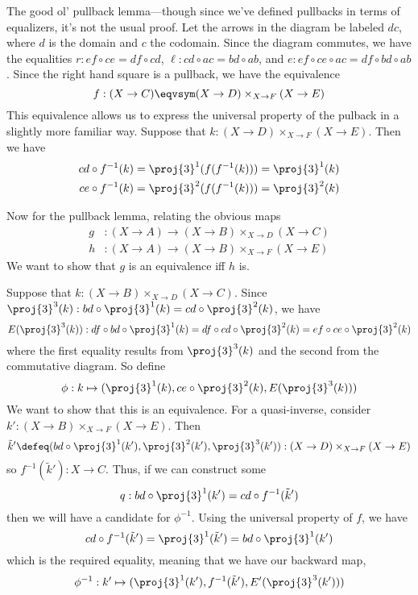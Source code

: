  \soln
The good ol' pullback lemma---though since we've defined pullbacks in terms of
equalizers, it's not the usual proof.  Let the arrows in the diagram be labeled
$dc$, where $d$ is the domain and $c$ the codomain.  Since the diagram
commutes, we have the equalities $r : ef \circ ce = df \circ cd$, 
$\ell : cd \circ ac = bd \circ ab$, and $e : ef \circ ce \circ ac = df \circ bd
\circ ab$.  Since the right hand square is a pullback, we have the equivalence
\[
  f : (X \to C) \eqvsym (X \to D) \times_{X \to F} (X \to E)
\]
This equivalence allows us to express the universal property of the pulback in
a slightly more familiar way.  Suppose that $k : (X \to D) \times_{X \to F}
(X \to E)$.  Then we have
\begin{align*}
  cd \circ f^{-1}(k) &= \proj{3}^{1}(f(f^{-1}(k))) = \proj{3}^{1}(k) \\
  ce \circ f^{-1}(k) &= \proj{3}^{2}(f(f^{-1}(k))) = \proj{3}^{2}(k)
\end{align*}


Now for the pullback lemma, relating the obvious maps
\begin{align*}
  g &: (X \to A) \to (X \to B) \times_{X \to D} (X \to C) \\
  h &: (X \to A) \to (X \to B) \times_{X \to F} (X \to E)
\end{align*}
We want to show that $g$ is an equivalence iff $h$ is.


Suppose that $k : (X \to B) \times_{X \to D} (X \to C)$.  Since
$\proj{3}^{3}(k) : bd \circ \proj{3}^{1}(k) = cd \circ \proj{3}^{2}(k)$, we
have
\[
  E(\proj{3}^{3}(k))
  :
  df \circ bd \circ \proj{3}^{1}(k) 
  = df \circ cd \circ \proj{3}^{2}(k)
  = ef \circ ce \circ \proj{3}^{2}(k)
\]
where the first equality results from $\proj{3}^{3}(k)$ and the second from the
commutative diagram.  So define
\[
  \phi : k \mapsto (\proj{3}^{1}(k), ce \circ \proj{3}^{2}(k),
  E(\proj{3}^{3}(k)))
\]
We want to show that this is an equivalence.  For a quasi-inverse, consider
$k' : (X \to B) \times_{X \to F} (X \to E)$.  Then 
\[
    \tilde{k}'
    \defeq
    (bd \circ \proj{3}^{1}(k'), \proj{3}^{2}(k'), \proj{3}^{3}(k'))
    :
    (X \to D) \times_{X \to F} (X \to E)
\]
so $f^{-1}(\tilde{k}') : X \to C$.  Thus, if we can construct some
\[
  q : bd \circ \proj{3}^{1}(k') = cd \circ f^{-1}(\tilde{k}')
\]
then we will have a candidate for $\phi^{-1}$.  Using the universal property of
$f$, we have
\[
  cd \circ f^{-1}(\tilde{k}')
  = \proj{3}^{1}(\tilde{k}')
  = bd \circ \proj{3}^{1}(k')
\]
which is the required equality, meaning that we have our backward map,
\[
  \phi^{-1} : k' \mapsto (\proj{3}^{1}(k'), f^{-1}(\tilde{k}'), E'(\proj{3}^{3}(k')))
\]


